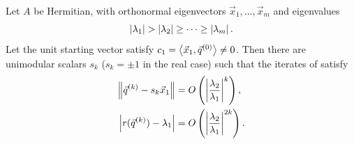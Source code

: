 \begin{theorem}
  \label{thm:power}
  Let $A$ be Hermitian, with orthonormal eigenvectors $\vec{x}_1, \dots, \vec{x}_m$ and eigenvalues
  \begin{equation*}
    \left\lvert \lambda_1 \right\rvert > \left\lvert \lambda_2 \right\rvert \ge \cdots \ge \left\lvert \lambda_m \right\rvert.
  \end{equation*}
  Let the unit starting vector satisfy $c_1 = \left\langle \vec{x}_1, \vec{q}^{(0)} \right\rangle \ne 0$. Then there are unimodular scalars $s_k$ ($s_k = \pm 1$ in the real case) such that the iterates of  satisfy
  \begin{align}
    \left\lVert \vec{q}^{(k)} - s_k\vec{x}_1 \right\rVert &= O\left(\left\lvert \frac{\lambda_2}{\lambda_1} \right\rvert^k\right), \\
    \left\lvert r(\vec{q}^{(k)}) - \lambda_1 \right\rvert &= O\left(\left\lvert \frac{\lambda_2}{\lambda_1} \right\rvert^{2k}\right).
  \end{align}
\end{theorem}

